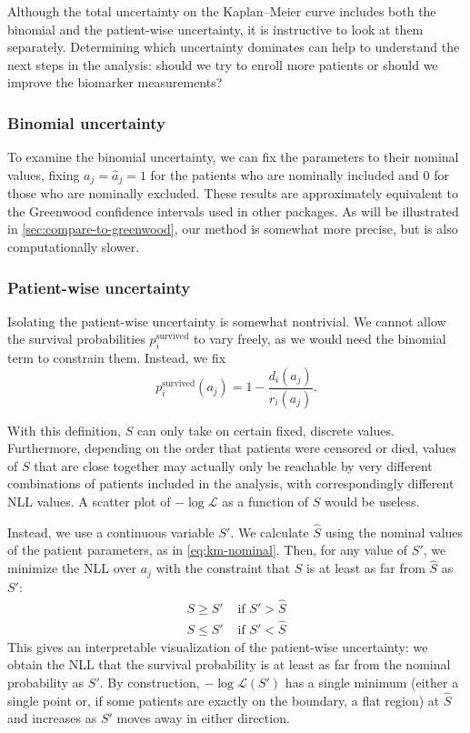 \documentclass[article]{jss}
\newcommand{\KM}{Kaplan--Meier} %
\begin{document}
Although the total uncertainty on the \KM{} curve includes both the binomial and the patient-wise uncertainty, it is instructive to look at them separately. Determining which uncertainty dominates can help to understand the next steps in the analysis: should we try to enroll more patients or should we improve the biomarker measurements?

\subsubsection{Binomial uncertainty}

To examine the binomial uncertainty, we can fix the parameters to their nominal values, fixing \(a_j=\hat{a}_j=1\) for the patients who are nominally included and \(0\) for those who are nominally excluded. These results are approximately equivalent to the Greenwood confidence intervals used in other packages. As will be illustrated in \cref{sec:compare-to-greenwood}, our method is somewhat more precise, but is also computationally slower.

\subsubsection{Patient-wise uncertainty}

Isolating the patient-wise uncertainty is somewhat nontrivial. We cannot allow the survival probabilities \(p_i^\text{survived}\) to vary freely, as we would need the binomial term to constrain them. Instead, we fix
\begin{equation}
p_i^\text{survived}(a_j) = 1 - \frac{d_i(a_j)}{r_i(a_j)}.
\end{equation}

With this definition, \(S\) can only take on certain fixed, discrete values. Furthermore, depending on the order that patients were censored or died, values of \(S\) that are close together may actually only be reachable by very different combinations of patients included in the analysis, with correspondingly different NLL values. A scatter plot of \(-\log\mathcal{L}\) as a function of \(S\) would be useless.

Instead, we use a continuous variable \(S'\). We calculate \(\hat{S}\) using the nominal values of the patient parameters, as in \cref{eq:km-nominal}. Then, for any value of \(S'\), we minimize the NLL over \(a_j\) with the constraint that \(S\) is at least as far from \(\hat{S}\) as \(S'\):
\begin{align}
S \ge S' & \text{ if } S' > \hat{S} \\
S \le S' & \text{ if } S' < \hat{S}
\end{align}
This gives an interpretable visualization of the patient-wise uncertainty: we obtain the NLL that the survival probability is at least as far from the nominal probability as \(S'\). By construction, \(-\log\mathcal{L}(S')\) has a single minimum (either a single point or, if some patients are exactly on the boundary, a flat region) at \(\hat{S}\) and increases as \(S'\) moves away in either direction.
\end{document}
